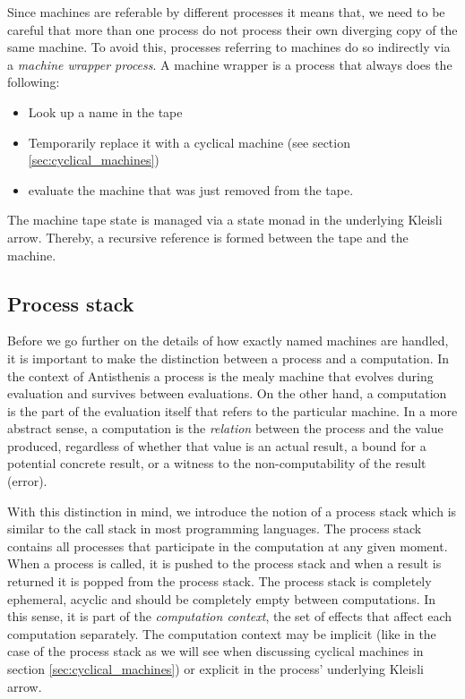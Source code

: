 Since machines are referable by different processes it means
that, we need to be careful that more than one process do not process their
own diverging copy of the same machine. To avoid this, processes referring to machines do so
indirectly via a \emph{machine wrapper process}. A machine wrapper is
a process that always does the following:

\begin{itemize}
\item Look up a name in the tape
\item Temporarily replace it with a cyclical machine (see section
  \ref{sec:cyclical_machines})
\item evaluate the machine that was just removed from the tape.
\end{itemize}

The machine tape state is managed via a state monad in the underlying
Kleisli arrow. Thereby, a recursive reference is formed between the
tape and the machine.

\subsection{Process stack}
\label{sec:process_stack}

Before we go further on the details of how exactly named machines
are handled, it is important to make the distinction between a process
and a computation. In the context of Antisthenis a process is the
mealy machine that evolves during evaluation and survives between
evaluations. On the other hand, a computation is the part of the
evaluation itself that refers to the particular machine. In a more
abstract sense, a computation is the \emph{relation} between the
process and the value produced, regardless of whether that value is an
actual result, a bound for a potential concrete result, or a witness to the
non-computability of the result (error).

With this distinction in mind, we introduce the notion of a process
stack which is similar to the call stack in most programming
languages. The process stack contains all processes that participate
in the computation at any given moment. When a process is called, it
is pushed to the process stack and when a result is returned it is
popped from the process stack. The process stack is completely
ephemeral, acyclic and should be completely empty between
computations. In this sense, it is part of the \emph{computation
  context}, the set of effects that affect each computation
separately. The computation context may be implicit (like in the case
of the process stack as we will see when discussing cyclical machines
in section \ref{sec:cyclical_machines}) or explicit in the process'
underlying Kleisli arrow.

